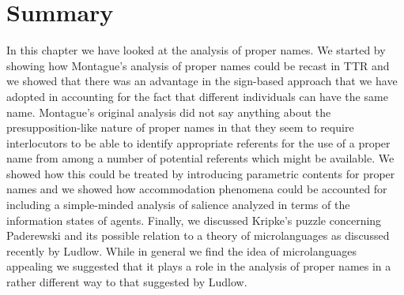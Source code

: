 \section{Summary}

In this chapter we have looked at the analysis of proper names.  We
started by showing how Montague's analysis of proper names could be
recast in TTR and we showed that there was an advantage in the
sign-based approach that we have adopted in accounting for the fact
that different individuals can have the same name.  Montague's
original analysis did not say anything about the presupposition-like
nature of proper names in that they seem to require interlocutors to
be able to identify appropriate referents for the use of a proper name
from among a number of potential referents which might be available.
We showed how this could be treated by introducing parametric
contents for proper names and we showed how accommodation phenomena
could be accounted for including a simple-minded analysis of salience
analyzed in terms of the information states of agents.  Finally, we
discussed Kripke's puzzle concerning Paderewski and its possible
relation to a theory of microlanguages as discussed recently by
Ludlow.  While in general we find the idea of microlanguages appealing
we suggested that it plays a role in the analysis of proper names in a
rather different way to that suggested by Ludlow.  
  
  


